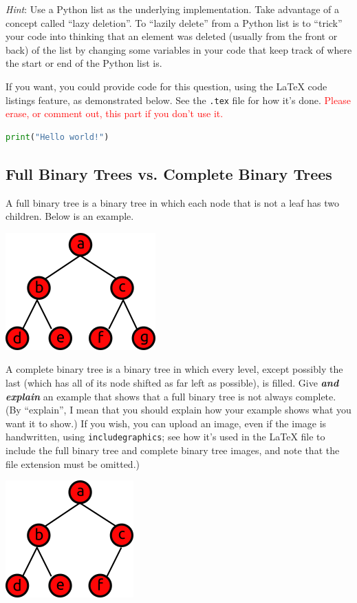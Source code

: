 \documentclass{article}
\begin{document}
\textit{Hint}: Use a Python list as the underlying implementation. Take advantage of a concept called ``lazy deletion''. To ``lazily delete'' from a Python list is to ``trick'' your code into thinking that an element was deleted (usually from the front or back) of the list by changing some variables in your code that keep track of where the start or end of the Python list is.

\begin{mdframed}
\vspace{3em}
\end{mdframed}

If you want, you could provide code for this question, using the LaTeX code listings feature, as demonstrated below. See the \lstinline{.tex} file for how it's done. \textcolor{red}{Please erase, or comment out, this part if you don't use it.}

\begin{lstlisting}[language=Python]
print("Hello world!")
\end{lstlisting}

\subsection{Full Binary Trees vs. Complete Binary Trees}

A full binary tree is a binary tree in which each node that is not a leaf has two children. Below is an example.

\includegraphics{full_binary_tree}

A complete binary tree is a binary tree in which every level, except possibly the last (which has all of its node shifted as far left as possible), is filled. Give \textbf{\textit{and explain}} an example that shows that a full binary tree is not always complete. (By ``explain'', I mean that you should explain how your example shows what you want it to show.) If you wish, you can upload an image, even if the image is handwritten, using \lstinline{includegraphics}; see how it's used in the LaTeX file to include the full binary tree and complete binary tree images, and note that the file extension must be omitted.)

\includegraphics{complete_binary_tree}

\begin{mdframed}
\vspace{3em}
\end{mdframed}

\end{document}
